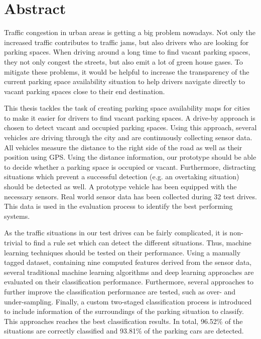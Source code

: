 

\chapter*{Abstract}

Traffic congestion in urban areas is getting a big problem nowadays. Not only the increased traffic contributes to traffic jams, but also drivers who are looking for parking spaces. When driving around a long time to find vacant parking spaces, they not only congest the streets, but also emit a lot of green house gases.
To mitigate these problems, it would be helpful to increase the transparency of the current parking space availability situation to help drivers navigate directly to vacant parking spaces close to their end destination. 

This thesis tackles the task of creating parking space availability maps for cities to make it easier for drivers to find vacant parking spaces. A drive-by approach is chosen to detect vacant and occupied parking spaces. 
Using this approach, several vehicles are driving through the city and are continuously collecting sensor data. All vehicles measure the distance to the right side of the road as well as their position using GPS. Using the distance information, our prototype should be able to decide whether a parking space is occupied or vacant. Furthermore, distracting situations which prevent a successful detection (e.g. an overtaking situation) should be detected as well. 
A prototype vehicle has been equipped with the necessary sensors. Real world sensor data has been collected during 32 test drives. This data is used in the evaluation process to identify the best performing systems.

As the traffic situations in our test drives can be fairly complicated, it is non-trivial to find a rule set which can detect the different situations. Thus, machine learning techniques should be tested on their performance. Using a manually tagged dataset, containing nine computed features derived from the sensor data, several traditional machine learning algorithms and deep learning approaches are evaluated on their classification performance. Furthermore, several approaches to further improve the classification performance are tested, such as over- and under-sampling. 
Finally, a custom two-staged classification process is introduced to include information of the surroundings of the parking situation to classify. This approaches reaches the best classification results. In total, 96.52\% of the situations are correctly classified and 93.81\% of the parking cars are detected.



